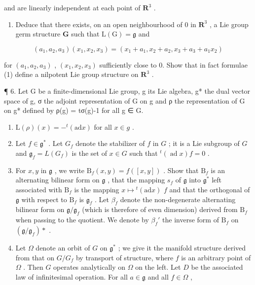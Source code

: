 and are linearly independent at each point of \(\mathbf{R}^3\) .

\begin{enumerate}
\def\labelenumi{(\alph{enumi})}
\setcounter{enumi}{1}
\tightlist
\item
  Deduce that there exists, on an open neighbourhood of 0 in \(\mathbf{R}^3\) , a Lie group germ structure \(\mathbf{G}\) such that \(\mathrm{L}(\mathrm{G}) = \mathfrak{g}\) and
\end{enumerate}

\[
(a _ {1}, a _ {2}, a _ {3}) (x _ {1}, x _ {2}, x _ {3}) = (x _ {1} + a _ {1}, x _ {2} + a _ {2}, x _ {3} + a _ {3} + a _ {1} x _ {2})\tag{1}
\]

for \((a_{1}, a_{2}, a_{3})\) , \((x_{1}, x_{2}, x_{3})\) sufficiently close to 0. Show that in fact formulae (1) define a nilpotent Lie group structure on \(\mathbf{R}^{3}\) .

¶ 6. Let G be a finite-dimensional Lie group, g its Lie algebra, g* the dual vector space of g, σ the adjoint representation of G on g and ρ the representation of G on g* defined by ρ(g) = tσ(g)-1 for all g ∈ G.

\begin{enumerate}
\def\labelenumi{(\alph{enumi})}
\item
  \(\mathrm{L}(\rho)(x) = -^{t}(\mathrm{ad} x)\) for all \(x \in g\) .
\item
  Let \(f \in \mathfrak{g}^*\) . Let \(G_f\) denote the stabilizer of \(f\) in \(G\) ; it is a Lie subgroup of \(G\) and \(\mathfrak{g}_f = L(G_f)\) is the set of \(x \in G\) such that \({}^t (\operatorname{ad}x)f = 0\) .
\item
  For \(x, y\) in \(\mathfrak{g}\) , we write \(\mathrm{B}_f(x, y) = f([x, y])\) . Show that \(\mathrm{B}_f\) is an alternating bilinear form on \(\mathfrak{g}\) , that the mapping \(s_f\) of \(\mathfrak{g}\) into \(\mathfrak{g}^*\) left associated with \(\mathrm{B}_f\) is the mapping \(x \mapsto {}^t (\mathrm{ad}x)\) \(f\) and that the orthogonal of \(\mathfrak{g}\) with respect to \(\mathrm{B}_f\) is \(\mathfrak{g}_f\) . Let \(\beta_f\) denote the non-degenerate alternating bilinear form on \(\mathfrak{g} / \mathfrak{g}_f\) (which is therefore of even dimension) derived from \(\mathrm{B}_f\) when passing to the quotient. We denote by \(\beta_f'\) the inverse form of \(\mathrm{B}_f\) on \((\mathfrak{g} / \mathfrak{g}_f)*\) .
\item
  Let \(\Omega\) denote an orbit of \(G\) on \(\mathfrak{g}^*\) ; we give it the manifold structure derived from that on \(G / G_f\) by transport of structure, where \(f\) is an arbitrary point of \(\Omega\) . Then \(G\) operates analytically on \(\Omega\) on the left. Let \(D\) be the associated law of infinitesimal operation. For all \(a \in \mathfrak{g}\) and all \(f \in \Omega\) ,
\end{enumerate}

